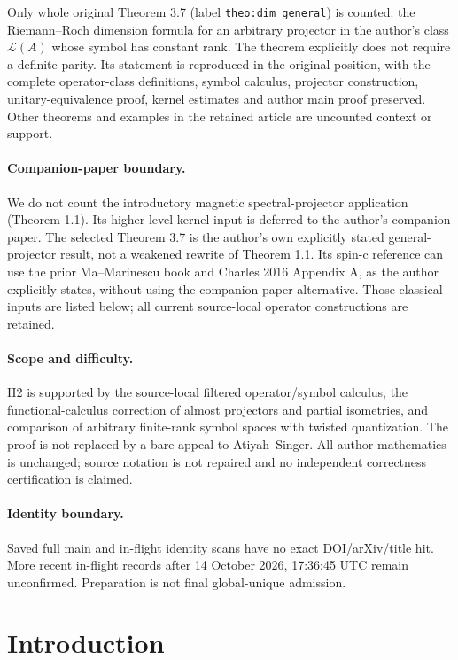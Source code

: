 \documentclass[10pt,a4paper]{article}
\theoremstyle{definition}
\numberwithin{equation}{section}
\begin{document}
Only whole original Theorem 3.7 (label \texttt{theo:dim\_general}) is counted: the Riemann--Roch dimension formula for an arbitrary projector in the author's class $\mathcal L(A)$ whose symbol has constant rank. The theorem explicitly does not require a definite parity. Its statement is reproduced in the original position, with the complete operator-class definitions, symbol calculus, projector construction, unitary-equivalence proof, kernel estimates and author main proof preserved. Other theorems and examples in the retained article are uncounted context or support.

\paragraph{Companion-paper boundary.} We do not count the introductory magnetic spectral-projector application (Theorem 1.1). Its higher-level kernel input is deferred to the author's companion paper. The selected Theorem 3.7 is the author's own explicitly stated general-projector result, not a weakened rewrite of Theorem 1.1. Its spin-c reference can use the prior Ma--Marinescu book and Charles 2016 Appendix A, as the author explicitly states, without using the companion-paper alternative. Those classical inputs are listed below; all current source-local operator constructions are retained.

\paragraph{Scope and difficulty.} H2 is supported by the source-local filtered operator/symbol calculus, the functional-calculus correction of almost projectors and partial isometries, and comparison of arbitrary finite-rank symbol spaces with twisted quantization. The proof is not replaced by a bare appeal to Atiyah--Singer. All author mathematics is unchanged; source notation is not repaired and no independent correctness certification is claimed.

\paragraph{Identity boundary.} Saved full main and in-flight identity scans have no exact DOI/arXiv/title hit. More recent in-flight records after 14 October 2026, 17:36:45 UTC remain unconfirmed. Preparation is not final global-unique admission.

\section{Introduction}
\end{document}
